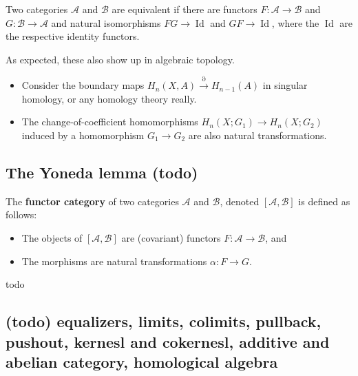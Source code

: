 \begin{definition}
    Two categories $\mathcal{A}$ and $\mathcal{B}$ are equivalent if there are functors $F \colon \mathcal{A} \to \mathcal{B}$ and $G \colon \mathcal{B} \to \mathcal{A}$ and natural isomorphisms $FG \to \operatorname{Id}$ and $GF \to \operatorname{Id}$, where the $\operatorname{Id}$ are the respective identity functors.
\end{definition}
\begin{example}
    As expected, these also show up in algebraic topology.
    \begin{itemize}
        \item Consider the boundary maps $H_n (X,A) \overset{\partial }{\to} H_{n-1}(A)$ in singular homology, or any homology theory really.
        \item The change-of-coefficient homomorphisms $H_n (X;G_1)\to H_n (X;G_2)$ induced by a homomorphism $G_1\to G_2$ are also natural transformations.
    \end{itemize}
\end{example}

\subsection{The Yoneda lemma (todo)}
\begin{definition}
    The \textbf{functor category} of two categories $\mathcal{A} $ and $\mathcal{B} $, denoted $[\mathcal{A} ,\mathcal{B} ]$ is defined as follows:
    \begin{itemize}
        \item The objects of $[\mathcal{A} ,\mathcal{B} ]$ are (covariant) functors $F \colon \mathcal{A}  \to \mathcal{B} $, and 
        \item The morphisms are natural transformations $\alpha \colon F \to G$.
    \end{itemize}
\end{definition}
todo

\subsection{(todo) equalizers, limits, colimits, pullback, pushout, kernesl and cokernesl, additive and abelian category, homological algebra }
